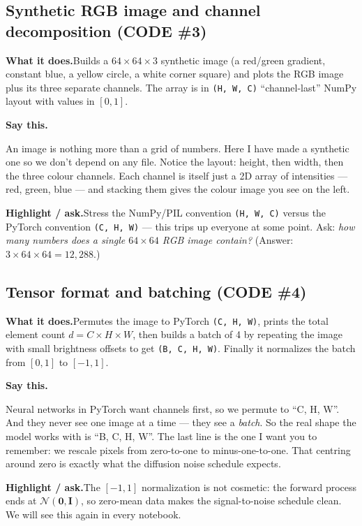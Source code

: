 \documentclass[11pt]{article}
\newenvironment{saythis}{%
  \par\smallskip\noindent
  \begin{list}{}{%
    \setlength{\leftmargin}{1.2em}%
    \setlength{\rightmargin}{0.5em}%
    \setlength{\topsep}{2pt}%
  }\item\relax
  \color{sayrule}\textbf{Say this.}\hspace{0.4em}\color{black}\itshape
}{%
  \end{list}\par\smallskip
}
\newcommand{\highlight}[1]{\par\smallskip\noindent\textcolor{hlcolor}{\textbf{Highlight / ask.}}\hspace{0.4em}#1\par\smallskip}
\newcommand{\whatdoes}[1]{\par\noindent\textbf{What it does.}\hspace{0.4em}#1\par}
\begin{document}
\subsection{Synthetic RGB image and channel decomposition (CODE \#3)}
\whatdoes{Builds a $64\times64\times3$ synthetic image (a red/green gradient, constant blue, a yellow
circle, a white corner square) and plots the RGB image plus its three separate channels. The array is
in \texttt{(H, W, C)} ``channel-last'' NumPy layout with values in $[0,1]$.}
\begin{saythis}
An image is nothing more than a grid of numbers. Here I have made a synthetic one so we don't depend
on any file. Notice the layout: height, then width, then the three colour channels. Each channel is
itself just a 2D array of intensities --- red, green, blue --- and stacking them gives the colour
image you see on the left.
\end{saythis}
\highlight{Stress the NumPy/PIL convention \texttt{(H, W, C)} versus the PyTorch convention
\texttt{(C, H, W)} --- this trips up everyone at some point. Ask: \emph{how many numbers does a single
$64\times64$ RGB image contain?} (Answer: $3\times64\times64 = 12{,}288$.)}

\subsection{Tensor format and batching (CODE \#4)}
\whatdoes{Permutes the image to PyTorch \texttt{(C, H, W)}, prints the total element count
$d = C\!\times\!H\!\times\!W$, then builds a batch of 4 by repeating the image with small brightness
offsets to get \texttt{(B, C, H, W)}. Finally it normalizes the batch from $[0,1]$ to $[-1,1]$.}
\begin{saythis}
Neural networks in PyTorch want channels first, so we permute to ``C, H, W''. And they never see one
image at a time --- they see a \emph{batch}. So the real shape the model works with is
``B, C, H, W''. The last line is the one I want you to remember: we rescale pixels from zero-to-one to
minus-one-to-one. That centring around zero is exactly what the diffusion noise schedule expects.
\end{saythis}
\highlight{The $[-1,1]$ normalization is not cosmetic: the forward process ends at
$\mathcal{N}(\mathbf{0},\mathbf{I})$, so zero-mean data makes the signal-to-noise schedule clean. We
will see this again in every notebook.}
\end{document}
